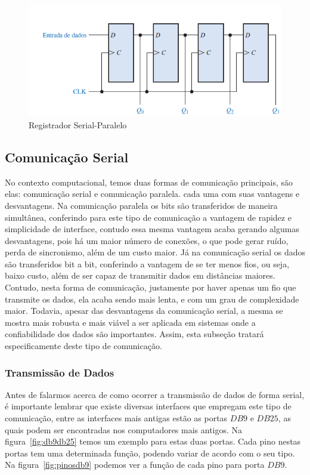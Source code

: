 \documentclass[12pt]{article}
\begin{document}
\begin{figure}[h]
\centering
\includegraphics[width=.5\textwidth]{img/Fig7RegistradorSerialParalelo.png}
\caption{Registrador Serial-Paralelo}
\label{fig:registradorsp}
\end{figure}

\subsection{Comunicação Serial}
No contexto computacional, temos duas formas de comunicação principais, são elas: comunicação serial e comunicação paralela. cada uma com suas vantagens e desvantagens. Na comunicação paralela os bits são transferidos de maneira simultânea, conferindo para este tipo de comunicação a vantagem de rapidez e simplicidade de interface, contudo essa mesma vantagem acaba gerando algumas desvantagens, pois há um maior número de conexões, o que pode gerar ruído, perda de sincronismo, além de um custo maior. Já na comunicação serial os dados são transferidos  bit a bit, conferindo a vantagem de se ter menos fios, ou seja, baixo custo, além de ser capaz de transmitir dados em distâncias maiores. Contudo, nesta forma de comunicação, justamente por haver apenas um fio que transmite os dados, ela acaba sendo mais lenta, e com um grau de complexidade maior. Todavia, apesar das desvantagens da comunicação serial, a mesma se mostra mais robusta e mais viável a ser aplicada em sistemas onde a confiabilidade dos dados são importantes. Assim, esta subseção tratará especificamente deste tipo de comunicação. 

\subsubsection{Transmissão de Dados}
Antes de falarmos acerca de como ocorrer a transmissão de dados de forma serial, é importante lembrar que existe diversas interfaces que empregam este tipo de comunicação, entre as interfaces mais antigas estão as portas $DB9$ e $DB25$, as quais podem ser encontradas nos computadores mais antigos. Na figura~\ref{fig:db9db25} temos um exemplo para estas duas portas. Cada pino nestas portas tem uma determinada função, podendo variar de acordo com o seu tipo. Na  figura~\ref{fig:pinosdb9} podemos ver a função de cada pino para porta $DB9$.
\end{document}
